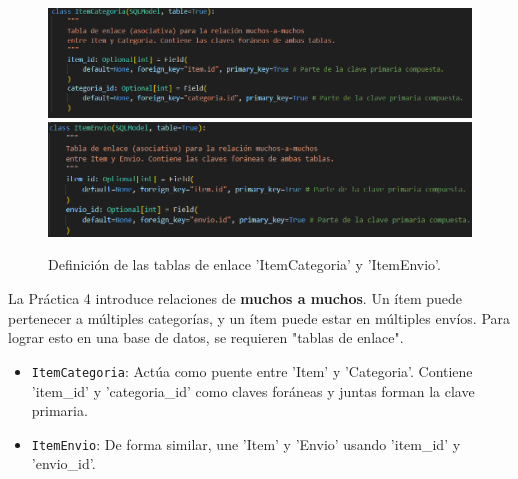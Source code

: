 \documentclass[12pt]{article}
\begin{document}
\begin{figure}[H]
    \centering
    \includegraphics[width=1\textwidth]{Imagenes/Prac4_1.1.png}
    \includegraphics[width=1\textwidth]{Imagenes/Prac4_1.2.png}
    \caption{Definición de las tablas de enlace 'ItemCategoria' y 'ItemEnvio'.}
\end{figure}

La Práctica 4 introduce relaciones de \textbf{muchos a muchos}. Un ítem puede pertenecer a múltiples categorías, y un ítem puede estar en múltiples envíos. Para lograr esto en una base de datos, se requieren "tablas de enlace".
\begin{itemize}
    \item \texttt{ItemCategoria}: Actúa como puente entre 'Item' y 'Categoria'. Contiene 'item\_id' y 'categoria\_id' como claves foráneas y juntas forman la clave primaria.
    \item \texttt{ItemEnvio}: De forma similar, une 'Item' y 'Envio' usando 'item\_id' y 'envio\_id'.
\end{itemize}
\end{document}
